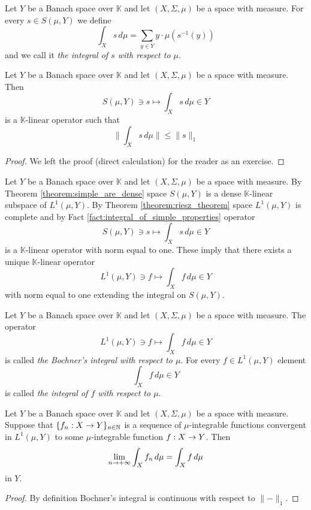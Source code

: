 \begin{definition}
Let $Y$ be a Banach space over $\mathbb{K}$ and let $(X,\Sigma,\mu)$ be a space with measure. For every $s \in S(\mu, Y)$ we define
$$\int_X s\,d\mu = \sum_{y\in Y}y\cdot \mu\left(s^{-1}(y)\right)$$
and we call it \textit{the integral of $s$ with respect to $\mu$}.
\end{definition}

\begin{fact}\label{fact:integral_of_simple_properties}
Let $Y$ be a Banach space over $\mathbb{K}$ and let $(X,\Sigma,\mu)$ be a space with measure. Then
$$S(\mu, Y)\ni s \mapsto \int_Xs\,d\mu \in Y$$
is a $\mathbb{K}$-linear operator such that
$$\bigg\lVert\int_Xs\,d\mu\bigg\rVert \leq \lVert s \rVert_1$$
\end{fact}
\begin{proof}
We left the proof (direct calculation) for the reader as an exercise.
\end{proof}
\noindent
Let $Y$ be a Banach space over $\mathbb{K}$ and let $(X,\Sigma,\mu)$ be a space with measure. By Theorem \ref{theorem:simple_are_dense} space $S(\mu, Y)$ is a dense $\mathbb{K}$-linear subspace of $L^1(\mu, Y)$. By Theorem \ref{theorem:riesz_theorem} space $L^1(\mu, Y)$ is complete and by Fact \ref{fact:integral_of_simple_properties} operator
$$S(\mu, Y)\ni s \mapsto \int_Xs\,d\mu \in Y$$
is a $\mathbb{K}$-linear operator with norm equal to one. These imply that there exists a unique $\mathbb{K}$-linear operator
$$L^1(\mu, Y)\ni f\mapsto \int_Xf\,d\mu\in Y$$
with norm equal to one extending the integral on $S(\mu, Y)$.

\begin{definition}
Let $Y$ be a Banach space over $\mathbb{K}$ and let $(X,\Sigma,\mu)$ be a space with measure. The operator
$$L^1(\mu, Y)\ni f\mapsto \int_Xf\,d\mu\in Y$$
is called \textit{the Bochner's integral with respect to $\mu$}. For every $f\in L^1(\mu, Y)$ element
$$\int_Xf\,d\mu\in Y$$
is called \textit{the integral of $f$ with respect to $\mu$}.
\end{definition}

\begin{corollary}\label{corollary:convergence_of_integral}
Let $Y$ be a Banach space over $\mathbb{K}$ and let $(X,\Sigma,\mu)$ be a space with measure. Suppose that $\{f_n:X\rightarrow Y\}_{n\in {\mathbb N}}$ is a sequence of $\mu$-integrable functions convergent in $L^1(\mu, Y)$ to some $\mu$-integrable function $f:X\rightarrow Y$. Then
$$\lim_{n\rightarrow +\infty}\int_Xf_n\,d\mu = \int_Xf\,d\mu$$
in $Y$.
\end{corollary}
\begin{proof}
By definition Bochner's integral is continuous with respect to $\lVert-\rVert_1$.
\end{proof}

